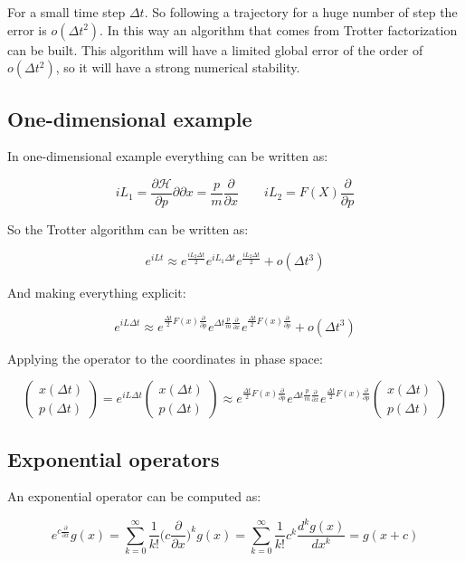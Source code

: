 	For a small time step $\Delta t$.
	So following a trajectory for a huge number of step the error is $o(\Delta t^2)$.
	In this way an algorithm that comes from Trotter factorization can be built.
	This algorithm will have a limited global error of the order of $o(\Delta t^2)$, so it will have a strong numerical stability.

	\subsection{One-dimensional example}
	In one-dimensional example everything can be written as:

	$$iL_1 = \frac{\partial\mathcal{H}}{\partial p}{\partial }{\partial x} = \frac{p}{m}\frac{\partial }{\partial x}\qquad iL_2 = F(X)\frac{\partial}{\partial p}$$

	So the Trotter algorithm can be written as:

	$$e^{iLt}\approx e^{\frac{iL_2\Delta t}{2}}e^{iL_1\Delta t}e^{\frac{iL_2\Delta t}{2}} + o(\Delta t^3)$$

	And making everything explicit:

	$$e^{iL\Delta t}\approx e^{\frac{\Delta t}{2}F(x)\frac{\partial}{\partial p}}e^{\Delta t\frac{p}{m}\frac{\partial}{\partial x}}e^{\frac{\Delta t}{2}F(x)\frac{\partial}{\partial p}} + o(\Delta t^3)$$

	Applying the operator to the coordinates in phase space:

	$$\begin{pmatrix}x(\Delta t)\\ p(\Delta t)\end{pmatrix}=e^{iL\Delta t}\begin{pmatrix}x(\Delta t)\\ p(\Delta t)\end{pmatrix}\approx e^{\frac{\Delta t}{2}F(x)\frac{\partial}{\partial p}}e^{\Delta t\frac{p}{m}\frac{\partial}{\partial x}}e^{\frac{\Delta t}{2}F(x)\frac{\partial}{\partial p}}\begin{pmatrix}x(\Delta t)\\ p(\Delta t)\end{pmatrix}$$

	\subsection{Exponential operators}
	An exponential operator can be computed as:

	$$e^{c\frac{\partial}{\partial x}}g(x) = \sum\limits_{k=0}^\infty\frac{1}{k!}\biggl(c\frac{\partial}{\partial x}\biggr)^kg(x) = \sum\limits_{k=0}^\infty\frac{1}{k!}c^k\frac{d^kg(x)}{dx^k} = g(x+c)$$

